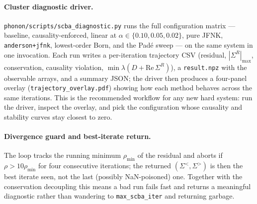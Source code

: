 \paragraph{Cluster diagnostic driver.}
\texttt{phonon/scripts/scba\_diagnostic.py} runs the full
configuration matrix --- baseline, causality-enforced, linear at
$\alpha\in\{0.10,0.05,0.02\}$, pure JFNK, \texttt{anderson+jfnk},
lowest-order Born, and the Pad\'e sweep --- on the same system in one
invocation. Each run writes a per-iteration trajectory CSV
(residual, $|\Sigma^{R}|_{\max}$, conservation, causality violation,
$\min\lambda(D+\mathrm{Re}\,\Sigma^{R})$), a \texttt{result.npz}
with the observable arrays, and a summary JSON; the driver then
produces a four-panel overlay (\texttt{trajectory\_overlay.pdf})
showing how each method behaves across the same iterations. This is
the recommended workflow for any new hard system: run the driver,
inspect the overlay, and pick the configuration whose causality and
stability curves stay closest to zero.

\paragraph{Divergence guard and best-iterate return.}
The loop tracks the running minimum $\rho_{\min}$ of the residual and
aborts if $\rho>10\rho_{\min}$ for four consecutive iterations; the
returned $(\Sigma^{<},\Sigma^{>})$ is then the best iterate seen, not
the last (possibly NaN-poisoned) one. Together with the conservation
decoupling this means a bad run fails fast and returns a meaningful
diagnostic rather than wandering to \texttt{max\_scba\_iter} and
returning garbage.

